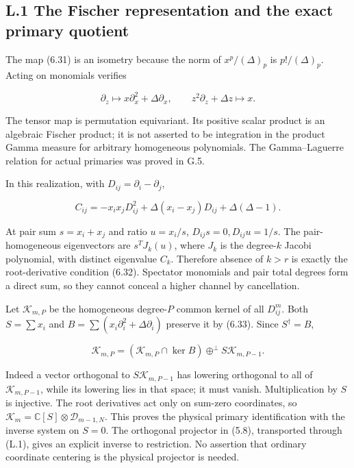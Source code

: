 \hypertarget{l.1-the-fischer-representation-and-the-exact-primary-quotient}{%
\subsection{L.1 The Fischer representation and the exact primary quotient}\label{l.1-the-fischer-representation-and-the-exact-primary-quotient}}

The map (6.31) is an isometry because the norm of \(x^p/(\Delta)_p\) is \(p!/(\Delta)_p\). Acting on monomials verifies

\[
\partial_z\mapsto x\partial_x^2+\Delta\partial_x,
\qquad z^2\partial_z+\Delta z\mapsto x.
\tag{L.1}
\]

The tensor map is permutation equivariant. Its positive scalar product is an algebraic Fischer product; it is not asserted to be integration in the product Gamma measure for arbitrary homogeneous polynomials. The Gamma--Laguerre relation for actual primaries was proved in G.5.

In this realization, with \(D_{ij}=\partial_i-\partial_j\),

\[
C_{ij}=-x_ix_jD_{ij}^2+\Delta(x_i-x_j)D_{ij}+\Delta(\Delta-1).
\tag{L.2}
\]

At pair sum \(s=x_i+x_j\) and ratio \(u=x_i/s\), \(D_{ij}s=0,D_{ij}u=1/s\). The pair-homogeneous eigenvectors are \(s^TJ_k(u)\), where \(J_k\) is the degree-\(k\) Jacobi polynomial, with distinct eigenvalue \(C_k\). Therefore absence of \(k>r\) is exactly the root-derivative condition (6.32). Spectator monomials and pair total degrees form a direct sum, so they cannot conceal a higher channel by cancellation.

Let \(\mathscr K_{m,P}\) be the homogeneous degree-\(P\) common kernel of all \(D_{ij}^m\). Both \(S=\sum x_i\) and \(B=\sum(x_i\partial_i^2+\Delta\partial_i)\) preserve it by (6.33). Since \(S^\dagger=B\),

\[
\mathscr K_{m,P}
=(\mathscr K_{m,P}\cap\ker B)
\mathbin{\oplus^\perp}S\mathscr K_{m,P-1}.
\tag{L.3}
\]

Indeed a vector orthogonal to \(S\mathscr K_{m,P-1}\) has lowering orthogonal to all of \(\mathscr K_{m,P-1}\), while its lowering lies in that space; it must vanish. Multiplication by \(S\) is injective. The root derivatives act only on sum-zero coordinates, so \(\mathscr K_m=\mathbb C[S]\otimes\mathscr D_{m-1,N}\). This proves the physical primary identification with the inverse system on \(S=0\). The orthogonal projector in (5.8), transported through (L.1), gives an explicit inverse to restriction. No assertion that ordinary coordinate centering is the physical projector is needed.

